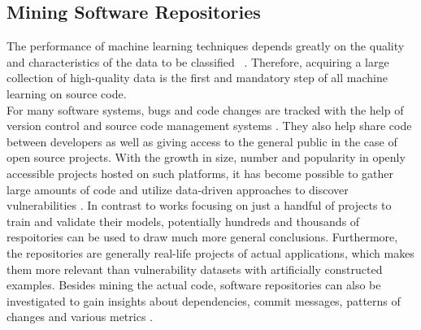 \documentclass[
	a4paper,
	pagesize,
	pdftex,
	12pt,
	twoside, %
	BCOR=5mm, %
	ngerman,
	fleqn,
	final,
	]{scrartcl}
\begin{document}
\subsection{Mining Software Repositories}\label{Mining-Software-Repositories}
The performance of machine learning techniques depends greatly on the quality and characteristics of the data to be classified ~\cite{Pang.2015}. Therefore, acquiring a large collection of high-quality data is the first and mandatory step of all machine learning on source code.\\
For many software systems, bugs and code changes are tracked with the help of version control and source code management systems \cite{Zhou.2017}. They also help share code between developers as well as giving access to the general public in the case of open source projects. With the growth in size, number and popularity in openly accessible projects hosted on such platforms, it has become possible to gather large amounts of code and utilize data-driven approaches to discover vulnerabilities \cite{Russell.2018}. In contrast to works focusing on just a handful of projects to train and validate their models, potentially hundreds and thousands of respoitories can be used to draw much more general conclusions. Furthermore, the repositories are generally real-life projects of actual applications, which makes them more relevant than vulnerability datasets with artificially constructed examples. Besides mining the actual code, software repositories can also be investigated to gain insights about dependencies, commit messages, patterns of changes and various metrics \citep{Liu.2018}.\\
\end{document}
